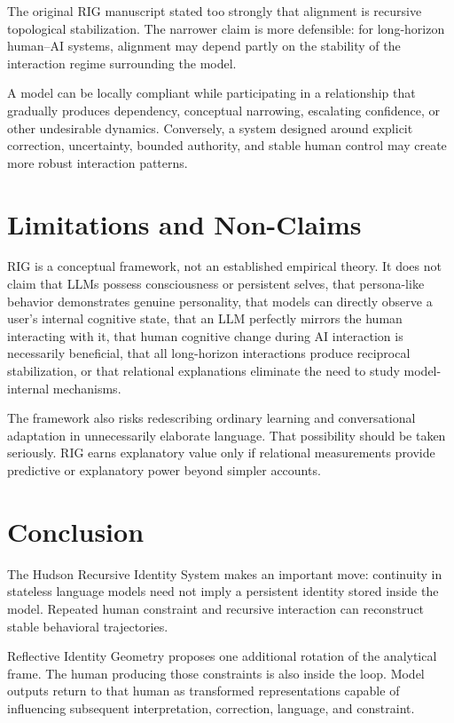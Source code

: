 \documentclass[12pt]{article}
\begin{document}
The original RIG manuscript stated too strongly that alignment is recursive topological stabilization. The narrower claim is more defensible: for long-horizon human--AI systems, alignment may depend partly on the stability of the interaction regime surrounding the model.

A model can be locally compliant while participating in a relationship that gradually produces dependency, conceptual narrowing, escalating confidence, or other undesirable dynamics. Conversely, a system designed around explicit correction, uncertainty, bounded authority, and stable human control may create more robust interaction patterns.

\section{Limitations and Non-Claims}

RIG is a conceptual framework, not an established empirical theory. It does not claim that LLMs possess consciousness or persistent selves, that persona-like behavior demonstrates genuine personality, that models can directly observe a user's internal cognitive state, that an LLM perfectly mirrors the human interacting with it, that human cognitive change during AI interaction is necessarily beneficial, that all long-horizon interactions produce reciprocal stabilization, or that relational explanations eliminate the need to study model-internal mechanisms.

The framework also risks redescribing ordinary learning and conversational adaptation in unnecessarily elaborate language. That possibility should be taken seriously. RIG earns explanatory value only if relational measurements provide predictive or explanatory power beyond simpler accounts.

\section{Conclusion}

The Hudson Recursive Identity System makes an important move: continuity in stateless language models need not imply a persistent identity stored inside the model. Repeated human constraint and recursive interaction can reconstruct stable behavioral trajectories.

Reflective Identity Geometry proposes one additional rotation of the analytical frame. The human producing those constraints is also inside the loop. Model outputs return to that human as transformed representations capable of influencing subsequent interpretation, correction, language, and constraint.
\end{document}
